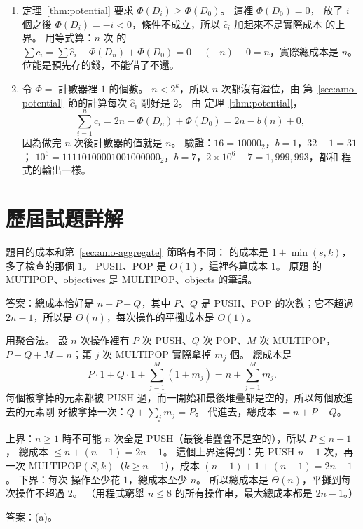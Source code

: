 \begin{enumerate}
\item 定理~\ref{thm:potential} 要求 $\Phi(D_i) \ge \Phi(D_0)$。 這裡 $\Phi(D_0) = 0$，
放了 $i$ 個之後 $\Phi(D_i) = -i < 0$，條件不成立，所以 $\hat{c}_i$ 加起來不是實際成本
的上界。 用等式算：$n$ 次  的 $\sum c_i = \sum \hat{c}_i - \Phi(D_n) +
\Phi(D_0) = 0 - (-n) + 0 = n$，實際總成本是 $n$。 位能是預先存的錢，不能借了不還。

\item 令 $\Phi = $ 計數器裡 $1$ 的個數。 $n < 2^k$，所以 $n$ 次都沒有溢位，由
第~\ref{sec:amo-potential}~節的計算每次 $\hat{c}_i$ 剛好是 $2$。 由
定理~\ref{thm:potential}，
\[
\sum_{i=1}^{n} c_i = 2n - \Phi(D_n) + \Phi(D_0) = 2n - b(n) + 0,
\]
因為做完 $n$ 次後計數器的值就是 $n$。 驗證：$16 = 10000_2$，$b = 1$，$32 - 1 = 31$；
$10^6 = 11110100001001000000_2$，$b = 7$，$2 \times 10^6 - 7 = 1{,}999{,}993$，都和
程式的輸出一樣。
\end{enumerate}

\section*{歷屆試題詳解}

題目的成本和第~\ref{sec:amo-aggregate}~節略有不同： 的成本是
$1 + \min(s, k)$，多了檢查的那個 $1$。 PUSH、POP 是 $O(1)$，這裡各算成本 $1$。 原題
的 MUTIPOP、objectives 是 MULTIPOP、objects 的筆誤。

答案：總成本恰好是 $n + P - Q$，其中 $P$、$Q$ 是 PUSH、POP 的次數；它不超過
$2n - 1$，所以是 $\Theta(n)$，每次操作的平攤成本是 $O(1)$。

用聚合法。 設 $n$ 次操作裡有 $P$ 次 PUSH、$Q$ 次 POP、$M$ 次 MULTIPOP，
$P + Q + M = n$；第 $j$ 次 MULTIPOP 實際拿掉 $m_j$ 個。 總成本是
\[
P \cdot 1 + Q \cdot 1 + \sum_{j=1}^{M} (1 + m_j) = n + \sum_{j=1}^{M} m_j .
\]
每個被拿掉的元素都被 PUSH 過，而一開始和最後堆疊都是空的，所以每個放進去的元素剛
好被拿掉一次：$Q + \sum_j m_j = P$。 代進去，總成本 $= n + P - Q$。

上界：$n \ge 1$ 時不可能 $n$ 次全是 PUSH（最後堆疊會不是空的），所以 $P \le n - 1$，
總成本 $\le n + (n - 1) = 2n - 1$。 這個上界達得到：先 PUSH $n - 1$ 次，再一次
MULTIPOP$(S, k)$（$k \ge n - 1$），成本 $(n - 1) + 1 + (n - 1) = 2n - 1$。 下界：每次
操作至少花 $1$，總成本至少 $n$。 所以總成本是 $\Theta(n)$，平攤到每次操作不超過 $2$。
（用程式窮舉 $n \le 8$ 的所有操作串，最大總成本都是 $2n - 1$。）

答案：(a)。

